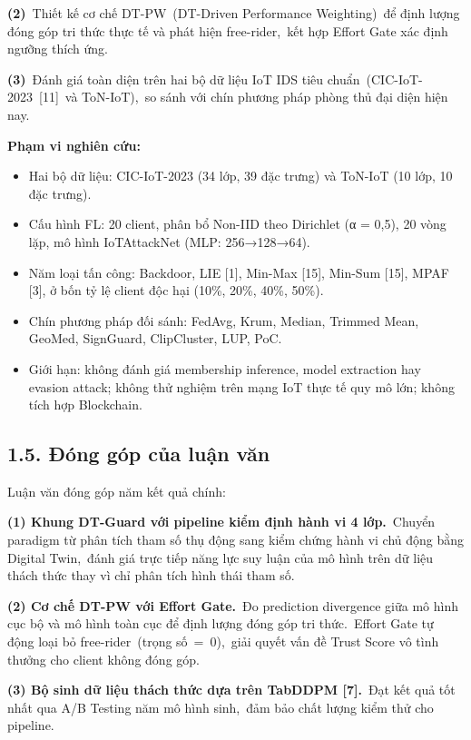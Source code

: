 \textbf{(2)}~Thiết kế cơ chế DT-PW~(DT-Driven Performance Weighting)~để định lượng đóng góp tri thức thực tế và phát hiện free-rider,~kết hợp Effort Gate xác định ngưỡng thích ứng.

\textbf{(3)}~Đánh giá toàn diện trên hai bộ dữ liệu IoT IDS tiêu chuẩn~(CIC-IoT-2023~{[}11{]}~và ToN-IoT),~so sánh với chín phương pháp phòng thủ đại diện hiện nay.

\textbf{Phạm vi nghiên cứu:}

\begin{itemize}
\item
  Hai bộ dữ liệu: CIC-IoT-2023 (34 lớp, 39 đặc trưng) và ToN-IoT (10 lớp, 10 đặc trưng).
\item
  Cấu hình FL: 20 client, phân bổ Non-IID theo Dirichlet (α = 0,5), 20 vòng lặp, mô hình IoTAttackNet (MLP: 256→128→64).
\item
  Năm loại tấn công: Backdoor, LIE {[}1{]}, Min-Max {[}15{]}, Min-Sum {[}15{]}, MPAF {[}3{]}, ở bốn tỷ lệ client độc hại (10\%, 20\%, 40\%, 50\%).
\item
  Chín phương pháp đối sánh: FedAvg, Krum, Median, Trimmed Mean, GeoMed, SignGuard, ClipCluster, LUP, PoC.
\item
  Giới hạn: không đánh giá membership inference, model extraction hay evasion attack; không thử nghiệm trên mạng IoT thực tế quy mô lớn; không tích hợp Blockchain.
\end{itemize}

\subsection{1.5. Đóng góp của luận văn}\label{ux111uxf3ng-guxf3p-cux1ee7a-luux1eadn-vux103n}

Luận văn đóng góp năm kết quả chính:

\textbf{(1) Khung DT-Guard với pipeline kiểm định hành vi 4 lớp.}~Chuyển paradigm từ phân tích tham số thụ động sang kiểm chứng hành vi chủ động bằng Digital Twin,~đánh giá trực tiếp năng lực suy luận của mô hình trên dữ liệu thách thức thay vì chỉ phân tích hình thái tham số.

\textbf{(2) Cơ chế DT-PW với Effort Gate.}~Đo prediction divergence giữa mô hình cục bộ và mô hình toàn cục để định lượng đóng góp tri thức.~Effort Gate tự động loại bỏ free-rider~(trọng số~=~0),~giải quyết vấn đề Trust Score vô tình thưởng cho client không đóng góp.

\textbf{(3) Bộ sinh dữ liệu thách thức dựa trên TabDDPM {[}7{]}.}~Đạt kết quả tốt nhất qua A/B Testing năm mô hình sinh,~đảm bảo chất lượng kiểm thử cho pipeline.

